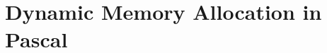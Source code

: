 \cleardoublepage
\def\pageLang{pas}
\section{Dynamic Memory Allocation in Pascal} %
\label{sec:dynamic_memory_allocation_in_pas}








